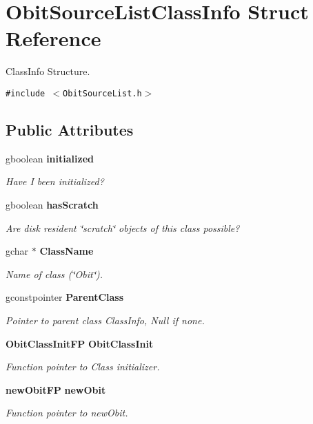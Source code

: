 \section{Obit\-Source\-List\-Class\-Info Struct Reference}
\label{structObitSourceListClassInfo}
Class\-Info Structure.  


{\tt \#include $<$Obit\-Source\-List.h$>$}

\subsection*{Public Attributes}
\begin{CompactItemize}
\item 
gboolean {\bf initialized}
\begin{CompactList}\small\item\em Have I been initialized? \item\end{CompactList}\item 
gboolean {\bf has\-Scratch}
\begin{CompactList}\small\item\em Are disk resident \char`\"{}scratch\char`\"{} objects of this class possible? \item\end{CompactList}\item 
gchar $\ast$ {\bf Class\-Name}
\begin{CompactList}\small\item\em Name of class (\char`\"{}Obit\char`\"{}). \item\end{CompactList}\item 
gconstpointer {\bf Parent\-Class}
\begin{CompactList}\small\item\em Pointer to parent class Class\-Info, Null if none. \item\end{CompactList}\item 
{\bf Obit\-Class\-Init\-FP} {\bf Obit\-Class\-Init}
\begin{CompactList}\small\item\em Function pointer to Class initializer. \item\end{CompactList}\item 
{\bf new\-Obit\-FP} {\bf new\-Obit}
\begin{CompactList}\small\item\em Function pointer to new\-Obit. \item\end{CompactList}\item 

\end{CompactItemize}
